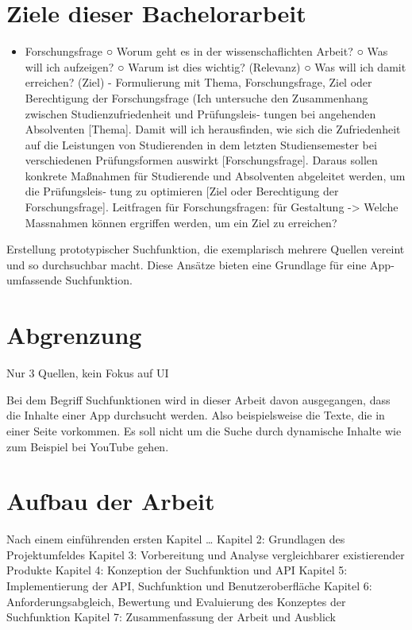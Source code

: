\documentclass[
  12pt,
  a4paperpaper,
]{report}
\providecommand{\tightlist}{%
  \setlength{\itemsep}{0pt}\setlength{\parskip}{0pt}}
\begin{document}
\section{Ziele dieser Bachelorarbeit}\label{ziele-dieser-bachelorarbeit}

\begin{itemize}
\tightlist
\item
  Forschungsfrage ○ Worum geht es in der wissenschaflichten Arbeit? ○
  Was will ich aufzeigen? ○ Warum ist dies wichtig? (Relevanz) ○ Was
  will ich damit erreichen? (Ziel) - Formulierung mit Thema,
  Forschungsfrage, Ziel oder Berechtigung der Forschungsfrage (Ich
  untersuche den Zusammenhang zwischen Studienzufriedenheit und
  Prüfungsleis‐ tungen bei angehenden Absolventen {[}Thema{]}. Damit
  will ich herausfinden, wie sich die Zufriedenheit auf die Leistungen
  von Studierenden in dem letzten Studiensemester bei verschiedenen
  Prüfungsformen auswirkt {[}Forschungsfrage{]}. Daraus sollen konkrete
  Maßnahmen für Studierende und Absolventen abgeleitet werden, um die
  Prüfungsleis‐ tung zu optimieren {[}Ziel oder Berechtigung der
  Forschungsfrage{]}. Leitfragen für Forschungsfragen: für Gestaltung
  -\textgreater{} Welche Massnahmen können ergriffen werden, um ein Ziel
  zu erreichen?
\end{itemize}

Erstellung prototypischer Suchfunktion, die exemplarisch mehrere Quellen
vereint und so durchsuchbar macht. Diese Ansätze bieten eine Grundlage
für eine App-umfassende Suchfunktion.

\section{Abgrenzung}\label{abgrenzung}

Nur 3 Quellen, kein Fokus auf UI

Bei dem Begriff Suchfunktionen wird in dieser Arbeit davon ausgegangen,
dass die Inhalte einer App durchsucht werden. Also beispielsweise die
Texte, die in einer Seite vorkommen. Es soll nicht um die Suche durch
dynamische Inhalte wie zum Beispiel bei YouTube gehen.

\section{Aufbau der Arbeit}\label{aufbau-der-arbeit}

Nach einem einführenden ersten Kapitel \ldots{} Kapitel 2: Grundlagen
des Projektumfeldes Kapitel 3: Vorbereitung und Analyse vergleichbarer
existierender Produkte Kapitel 4: Konzeption der Suchfunktion und API
Kapitel 5: Implementierung der API, Suchfunktion und Benutzeroberfläche
Kapitel 6: Anforderungsabgleich, Bewertung und Evaluierung des Konzeptes
der Suchfunktion Kapitel 7: Zusammenfassung der Arbeit und Ausblick
\end{document}
